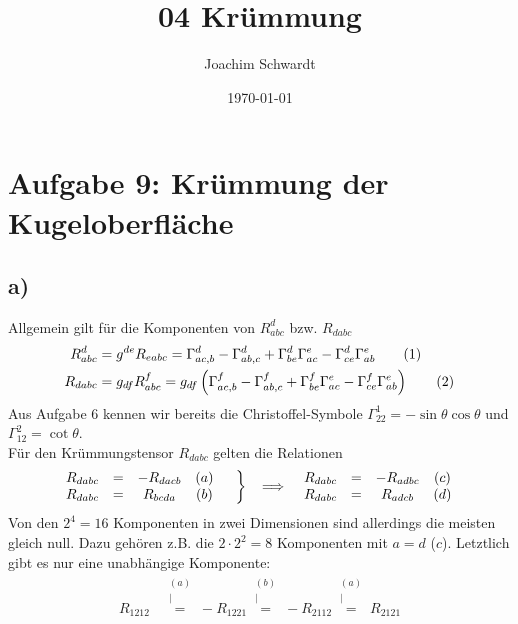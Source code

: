 \documentclass[a4paper,12pt]{article}
\newcommand\numberthis{\addtocounter{equation}{1}\tag{\theequation}}
\newcommand{\kom}{}
\newcommand{\kla}{}
\begin{document}
\title{04 Krümmung}
\author{Joachim Schwardt}
\date{\today}
\maketitle

\section*{Aufgabe 9: Krümmung der Kugeloberfläche}
\subsection*{a)}
Allgemein gilt für die Komponenten von $R^d_{abc}$ bzw. $R_{dabc}$
\begin{align*}
R^d_{abc}&=g^{de}R_{eabc}=\Gamma^d_{ac,b}-\Gamma^d_{ab,c}+\Gamma^d_{be}\Gamma^e_{ac}-\Gamma^d_{ce}\Gamma^e_{ab}\numberthis\label{eqn:R dabc}\\
R_{dabc}&=g_{df}R^f_{abc}=g_{df}\kla\left( {\Gamma^f_{ac,b}-\Gamma^f_{ab,c}+\Gamma^f_{be}\Gamma^e_{ac}-\Gamma^f_{ce}\Gamma^e_{ab}} \right)\numberthis\label{eqn:R d abc}
\end{align*}
Aus Aufgabe 6 kennen wir bereits die Christoffel-Symbole $\Gamma^1_{22}=-\sin\theta\cos\theta$ und $\Gamma^2_{12}=\cot\theta$.\\ Für den Krümmungstensor $R_{dabc}$ gelten die Relationen 
\begin{align*}
\begin{matrix}
R_{dabc}&=&-R_{dacb} &(a) \\ R_{dabc}&=&R_{bcda} &(b)
\end{matrix}\hspace{0.5cm}\left\}\hspace{0.4cm}\Longrightarrow\hspace{0.4cm}\begin{matrix}
R_{dabc}&=&-R_{adbc} &(c) \\ R_{dabc}&=&R_{adcb} &(d)
\end{matrix}\right.
\end{align*}
Von den $2^4=16$ Komponenten in zwei Dimensionen sind allerdings die meisten gleich null. Dazu gehören z.B. die $2\cdot 2^2=8$ Komponenten mit $a=d$ ($c$). Letztlich gibt es nur eine unabhängige Komponente:
\begin{align*}
R_{1212}&\kom\overset{\substack{{(a)} \\ |}}{=}-R_{1221}\kom\overset{\substack{{(b)} \\ |}}{=}-R_{2112}\kom\overset{\substack{{(a)} \\ |}}{=}R_{2121}
\end{align*}
\end{document}
